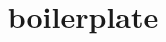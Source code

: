 \documentclass{article}
\begin{document}
\title{\latex boilerplate}
\author{}
\date{}

\maketitle
\end{document}
